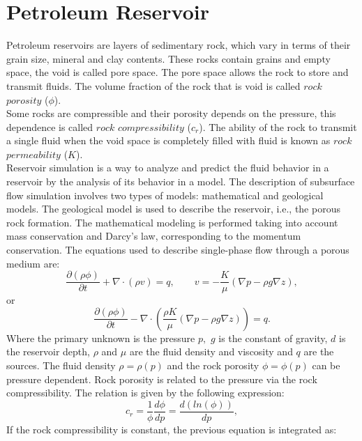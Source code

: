\documentclass[a4paper,10pt]{report}
\begin{document}
\section{Petroleum Reservoir}
\hspace{0.5cm}
Petroleum reservoirs are layers of sedimentary rock, which vary in terms of their grain size, mineral
and clay contents. 
These rocks contain grains and empty space, the void is called pore space.
The pore space allows the rock to 
store and transmit fluids. The volume fraction of the rock that is void is called $rock$
$porosity$ ($\phi$).\\
Some rocks are compressible and their porosity depends on the pressure, this dependence is called 
$rock$ $compressibility$ ($c_r$). 
The ability of the rock to transmit a single fluid when the void space is completely filled with fluid
is known as $rock$ $permeability$ (${K}$). \\
Reservoir simulation is a way to analyze and predict the fluid behavior in a reservoir
by the analysis of its behavior in a model. The description of subsurface flow simulation involves two types of models: 
mathematical and geological models. The geological model is used to describe the reservoir, i.e., the porous rock formation. 
The mathematical modeling is performed taking into account mass conservation and Darcy's law,
corresponding to the momentum conservation. The equations used to describe single-phase flow through a porous medium are:
\begin{equation}\label{eq:ce}
\frac{\partial (\rho \phi)}{\partial t}+ \nabla \cdot ( \rho {v})=q, \qquad v=-\frac{K}{\mu}(\nabla p-\rho g\nabla z),
\end{equation}
or
\begin{equation}\label{eq:ce1}
\frac{\partial (\rho \phi)}{\partial t}- \nabla \cdot \left( \frac{\rho{K}}{\mu}(\nabla {p}-\rho g\nabla z)\right)=q.
\end{equation}
Where the primary unknown is the pressure ${p},$ $g$ is the constant of gravity, $d$ is the reservoir depth,
$\rho$ and $\mu$ are the fluid density and viscosity and $q$ are the sources. The fluid density $\rho=\rho(p)$ and the rock porosity $\phi=\phi(p)$ can be pressure dependent.
Rock porosity is related to the pressure via the rock compressibility. The relation is given by the following expression:
\begin{equation*}
 c_r=\frac{1}{\phi}\frac{d\phi}{dp}=\frac{d(ln(\phi))}{dp},
\end{equation*}
If the rock compressibility is constant, the previous equation is integrated as:
\end{document}
